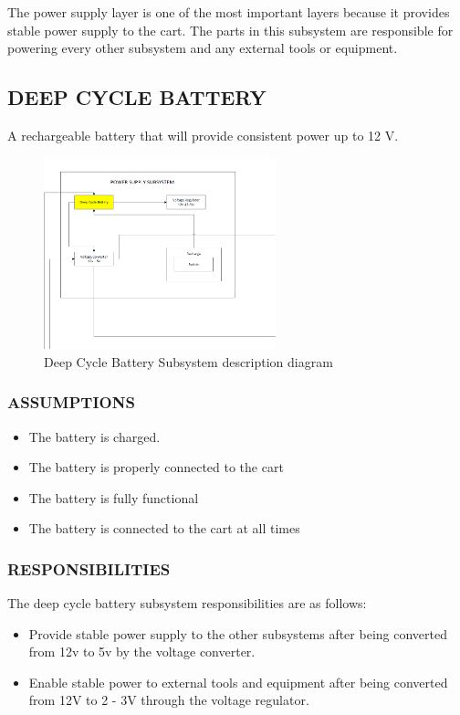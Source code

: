 The power supply layer is one of the most important layers because it provides stable power supply
to the cart. The parts in this subsystem are responsible for powering every other subsystem and any
external tools or equipment.

\subsection{DEEP CYCLE BATTERY}
A rechargeable battery that will provide consistent power up to 12 V.
\begin{figure}[h!]
	\centering
 	\includegraphics[width=0.60\textwidth]{images/battery}
 \caption{Deep Cycle Battery Subsystem description diagram}
\end{figure}

\subsubsection{ASSUMPTIONS}
\begin{itemize}
\item The battery is charged.
\item The battery is properly connected to the cart
\item The battery is fully functional
\item The battery is connected to the cart at all times
\end{itemize}

\subsubsection{RESPONSIBILITIES}
The deep cycle battery subsystem responsibilities are as follows:
\begin{itemize}
\item Provide stable power supply to the other subsystems after being converted from 12v to 5v by the voltage converter.
\item Enable stable power to external tools and equipment after being converted from 12V to 2 - 3V through the voltage regulator.
\end{itemize}

